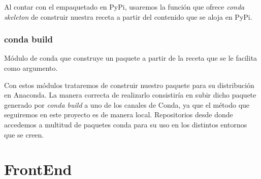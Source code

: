  Al contar con el empaquetado en PyPi, usaremos la función que ofrece \emph{conda skeleton} de construir nuestra receta a partir del contenido que se aloja en PyPi.
 
 \subsubsection*{conda build}
 Módulo de conda que construye un paquete a partir de la receta que se le facilita como argumento. 
 
 Con estos módulos trataremos de construir nuestro paquete para su distribución en Anaconda. La manera correcta de realizarlo consistiría en subir dicho paquete generado por \textit{conda build} a uno de los canales de Conda, ya que el método que seguiremos en este proyecto es de manera local. Repositorios desde donde accedemos a multitud de paquetes conda para su uso en los distintos entornos que se creen. 
 
\section{FrontEnd}
\label{sec:frontEnd}
